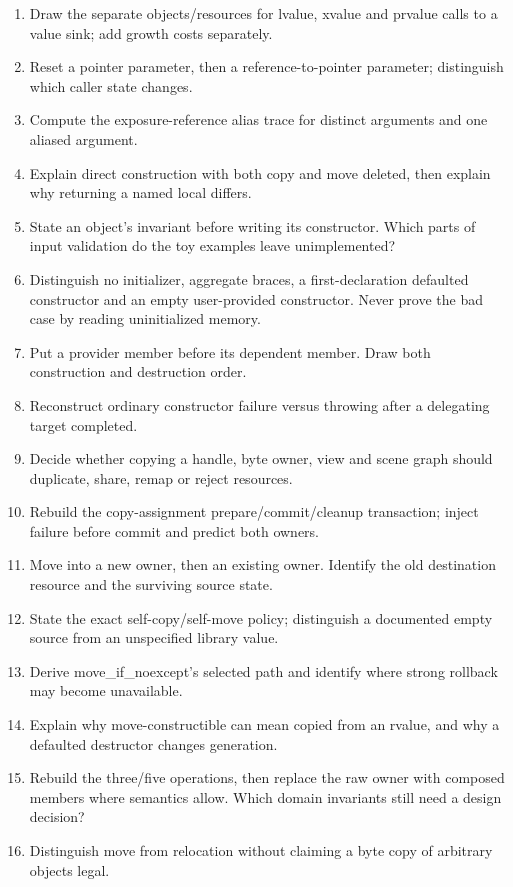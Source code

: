 \begin{enumerate}
\def\labelenumi{\arabic{enumi}.}
\tightlist
\item
  Draw the separate objects/resources for lvalue, xvalue and prvalue calls to a value sink; add growth costs separately.
\item
  Reset a pointer parameter, then a reference-to-pointer parameter; distinguish which caller state changes.
\item
  Compute the exposure-reference alias trace for distinct arguments and one aliased argument.
\item
  Explain direct construction with both copy and move deleted, then explain why returning a named local differs.
\item
  State an object's invariant before writing its constructor. Which parts of input validation do the toy examples leave unimplemented?
\item
  Distinguish no initializer, aggregate braces, a first-declaration defaulted constructor and an empty user-provided constructor. Never prove the bad case by reading uninitialized memory.
\item
  Put a provider member before its dependent member. Draw both construction and destruction order.
\item
  Reconstruct ordinary constructor failure versus throwing after a delegating target completed.
\item
  Decide whether copying a handle, byte owner, view and scene graph should duplicate, share, remap or reject resources.
\item
  Rebuild the copy-assignment prepare/commit/cleanup transaction; inject failure before commit and predict both owners.
\item
  Move into a new owner, then an existing owner. Identify the old destination resource and the surviving source state.
\item
  State the exact self-copy/self-move policy; distinguish a documented empty source from an unspecified library value.
\item
  Derive move\_if\_noexcept's selected path and identify where strong rollback may become unavailable.
\item
  Explain why move-constructible can mean copied from an rvalue, and why a defaulted destructor changes generation.
\item
  Rebuild the three/five operations, then replace the raw owner with composed members where semantics allow. Which domain invariants still need a design decision?
\item
  Distinguish move from relocation without claiming a byte copy of arbitrary objects legal.
\end{enumerate}

